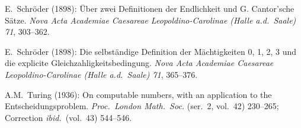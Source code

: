 \begin{thebibliography}{999}
E.~Schr\"{o}der (1898): \"{U}ber zwei Definitionen der Endlichkeit und
G. Cantor'sche S\"{a}tze.  {\it Nova Acta Academiae Caesareae
Leopoldino-Carolinae (Halle a.d.~Saale) 71}, 303--362.

E.~Schr\"{o}der (1898): Die selbst\"{a}ndige Definition der
M\"{a}chtigkeiten 0, 1, 2, 3 und die explicite
Gleichzahligkeitsbedingung.  {\it Nova Acta Academiae Caesareae
Leopoldino-Carolinae (Halle a.d.~Saale) 71}, 365--376.



A.M.~Turing (1936): On computable numbers, with an application to the
Entscheidungsproblem.  {\it Proc.~London Math.~Soc.} (ser.~2, vol.~42)
230--265; Correction {\it ibid.}~(vol.~43) 544--546.





\end{thebibliography}

